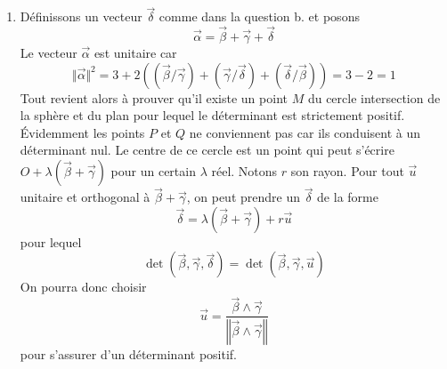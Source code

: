 \begin{enumerate}
\begin{enumerate}
\item Définissons un vecteur $\overrightarrow \delta$ comme dans la question b. et posons
\begin{displaymath}
 \overrightarrow{\alpha} = \overrightarrow{\beta} + \overrightarrow{\gamma} + \overrightarrow{\delta}
\end{displaymath}
Le vecteur $\overrightarrow{\alpha}$ est unitaire car
\begin{displaymath}
 \Vert \overrightarrow{ \alpha}\Vert^2 =
3 + 2 \left( (\overrightarrow{\beta}/ \overrightarrow{\gamma})
           + (\overrightarrow{\gamma}/ \overrightarrow{\delta})
           + (\overrightarrow{\delta}/ \overrightarrow{\beta})   \right)
=3 -2 =1 
\end{displaymath}
Tout revient alors à prouver qu'il existe un point $M$ du cercle intersection de la sphère et du plan pour lequel le déterminant est strictement positif. \'Evidemment les points $P$ et $Q$ ne conviennent pas car ils conduisent à un déterminant nul.\newline
Le centre de ce cercle est un point qui peut s'écrire $O + \lambda (\overrightarrow{\beta} + \overrightarrow{\gamma})$ pour un certain $\lambda$ réel. Notons $r$ son rayon. Pour tout $\overrightarrow u$ unitaire et orthogonal à $\overrightarrow{\beta} + \overrightarrow{\gamma}$, on peut prendre un $\overrightarrow{\delta}$ de la forme
\begin{displaymath}
 \overrightarrow{\delta} = \lambda (\overrightarrow{\beta} + \overrightarrow{\gamma}) + r \overrightarrow u
\end{displaymath}
pour lequel
\begin{displaymath}
 \det(\overrightarrow{\beta} , \overrightarrow{\gamma}, \overrightarrow{\delta})=
 \det(\overrightarrow{\beta} , \overrightarrow{\gamma}, \overrightarrow{u})
\end{displaymath}
On pourra donc choisir 
\begin{displaymath}
 \overrightarrow u = \frac
{\overrightarrow{\beta} \wedge \overrightarrow{\gamma}}
{\left\Vert\overrightarrow{\beta} \wedge \overrightarrow{\gamma}\right \Vert}
\end{displaymath}
pour s'assurer d'un déterminant positif.
\end{enumerate}


\end{enumerate}
